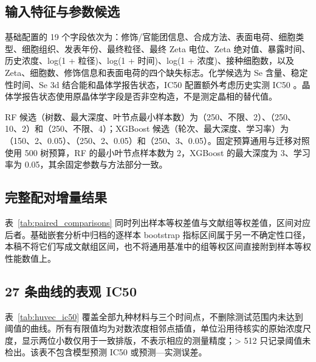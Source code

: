 \documentclass[letterpaper]{article}
\begin{document}
\subsection{输入特征与参数候选}

基础配置的 19 个字段依次为：修饰/官能团信息、合成方法、表面电荷、细胞类型、细胞组织、发表年份、最终粒径、最终 Zeta 电位、Zeta 绝对值、暴露时间、历史浓度、log(1 + 粒径)、log(1 + 时间)、log(1 + 浓度)、接种细胞数，以及 Zeta、细胞数、修饰信息和表面电荷的四个缺失标志。化学候选为 Se 含量、稳定性时间、Se 3d 结合能和晶体学报告状态，IC50 配置额外考虑历史实测 IC50 。晶体学报告状态使用原晶体学字段是否非空构造，不是测定晶相的替代值。

RF 候选（树数、最大深度、叶节点最小样本数）为（250、不限、2）、（250、10、2）和（250、不限、4）；XGBoost 候选（轮次、最大深度、学习率）为（150、2、0.05）、（250、2、0.05）和（250、3、0.05）。固定预算通用与迁移对照使用 500 树预算，RF 的最小叶节点样本数为 2，XGBoost 的最大深度为 3、学习率为 0.05，其余固定参数与方法部分一致。

\subsection{完整配对增量结果}

表~\ref{tab:paired_comparisons} 同时列出样本等权差值与文献组等权差值，区间对应后者。基础嵌套分析中归档的逐样本 bootstrap 指标区间属于另一不确定性口径，本稿不将它们写成文献组区间，也不将通用基准中的组等权区间直接附到样本等权性能数值上。

\begin{table}[H]
\centering
\caption{各配置相对对应基线的配对 MAE 差值，单位为存活率百分点。负值表示误差下降，区间来自 24 个文献组等权差值的 5000 次 bootstrap。}
\label{tab:paired_comparisons}
\small

\end{table}

\subsection{27 条曲线的表观 IC50}

表~\ref{tab:huvec_ic50} 覆盖全部九种材料与三个时间点，不删除测试范围内未达到阈值的曲线。所有有限值均为对数浓度相邻点插值，单位沿用待核实的原始浓度尺度，显示两位小数仅用于一致排版，不表示相应的测量精度；> 512 只记录阈值未检出。该表不包含模型预测 IC50 或预测—实测误差。

\begin{table}[H]
\centering
\caption{HUVEC 材料—时间曲线的表观 IC50，采用原始浓度尺度。重复次数与汇总方法待核实。}
\label{tab:huvec_ic50}
\small

\end{table}
\end{document}
